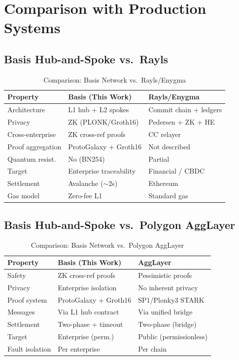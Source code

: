 \documentclass[conference]{IEEEtran}
\begin{document}
\section{Comparison with Production Systems}
\label{sec:comparison}

\subsection{Basis Hub-and-Spoke vs.\ Rayls}

\begin{table}[t]
  \centering
  \caption{Comparison: Basis Network vs.\ Rayls/Enygma}
  \label{tab:vs_rayls}
  \begin{tabular}{@{}L{2.2cm}L{2.4cm}L{2.4cm}@{}}
    \toprule
    \textbf{Property} & \textbf{Basis (This Work)} & \textbf{Rayls/Enygma} \\
    \midrule
    Architecture & L1 hub + L2 spokes & Commit chain + ledgers \\
    Privacy & ZK (PLONK/Groth16) & Pedersen + ZK + HE \\
    Cross-enterprise & ZK cross-ref proofs & CC relayer \\
    Proof aggregation & ProtoGalaxy + Groth16 & Not described \\
    Quantum resist. & No (BN254) & Partial \\
    Target & Enterprise traceability & Financial / CBDC \\
    Settlement & Avalanche ($\sim$2s) & Ethereum \\
    Gas model & Zero-fee L1 & Standard gas \\
    \bottomrule
  \end{tabular}
\end{table}

\subsection{Basis Hub-and-Spoke vs.\ Polygon AggLayer}

\begin{table}[t]
  \centering
  \caption{Comparison: Basis Network vs.\ Polygon AggLayer}
  \label{tab:vs_agglayer}
  \begin{tabular}{@{}L{2.2cm}L{2.4cm}L{2.4cm}@{}}
    \toprule
    \textbf{Property} & \textbf{Basis (This Work)} & \textbf{AggLayer} \\
    \midrule
    Safety & ZK cross-ref proofs & Pessimistic proofs \\
    Privacy & Enterprise isolation & No inherent privacy \\
    Proof system & ProtoGalaxy + Groth16 & SP1/Plonky3 STARK \\
    Messages & Via L1 hub contract & Via unified bridge \\
    Settlement & Two-phase + timeout & Two-phase (bridge) \\
    Target & Enterprise (perm.) & Public (permissionless) \\
    Fault isolation & Per enterprise & Per chain \\
    \bottomrule
  \end{tabular}
\end{table}
\end{document}
